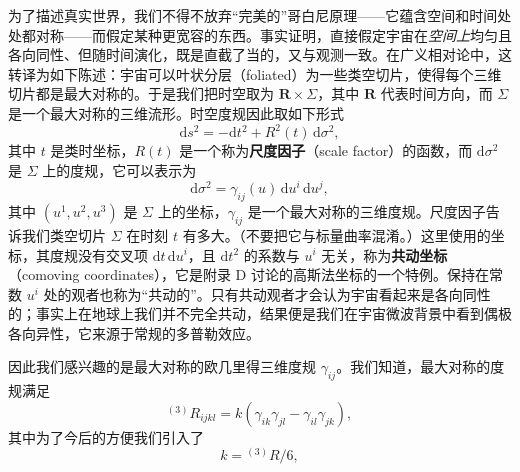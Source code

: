 为了描述真实世界，我们不得不放弃“完美的”哥白尼原理——它蕴含空间和时间处处都对称——而假定某种更宽容的东西。事实证明，直接假定宇宙在\emph{空间上}均匀且各向同性、但随时间演化，既是直截了当的，又与观测一致。在广义相对论中，这转译为如下陈述：宇宙可以叶状分层（foliated）为一些类空切片，使得每个三维切片都是最大对称的。于是我们把时空取为 $\mathbf{R}\times\Sigma$，其中 $\mathbf{R}$ 代表时间方向，而 $\Sigma$ 是一个最大对称的三维流形。时空度规因此取如下形式
\begin{equation*}
\mathrm{d}s^2 = -\mathrm{d}t^2 + R^2(t)\,\mathrm{d}\sigma^2,
\tag{8.21}
\end{equation*}
其中 $t$ 是类时坐标，$R(t)$ 是一个称为\textbf{尺度因子}（scale factor）的函数，而 $\mathrm{d}\sigma^2$ 是 $\Sigma$ 上的度规，它可以表示为
\begin{equation*}
\mathrm{d}\sigma^2 = \gamma_{ij}(u)\,\mathrm{d}u^i\,\mathrm{d}u^j,
\tag{8.22}
\end{equation*}
其中 $(u^1,u^2,u^3)$ 是 $\Sigma$ 上的坐标，$\gamma_{ij}$ 是一个最大对称的三维度规。尺度因子告诉我们类空切片 $\Sigma$ 在时刻 $t$ 有多大。（不要把它与标量曲率混淆。）这里使用的坐标，其度规没有交叉项 $\mathrm{d}t\,\mathrm{d}u^i$，且 $\mathrm{d}t^2$ 的系数与 $u^i$ 无关，称为\textbf{共动坐标}（comoving coordinates），它是附录 D 讨论的高斯法坐标的一个特例。保持在常数 $u^i$ 处的观者也称为“共动的”。只有共动观者才会认为宇宙看起来是各向同性的；事实上在地球上我们并不完全共动，结果便是我们在宇宙微波背景中看到偶极各向异性，它来源于常规的多普勒效应。

因此我们感兴趣的是最大对称的欧几里得三维度规 $\gamma_{ij}$。我们知道，最大对称的度规满足
\begin{equation*}
{}^{(3)}R_{ijkl} = k\left(\gamma_{ik}\gamma_{jl} - \gamma_{il}\gamma_{jk}\right),
\tag{8.23}
\end{equation*}
其中为了今后的方便我们引入了
\begin{equation*}
k = {}^{(3)}R/6,
\tag{8.24}
\end{equation*}

